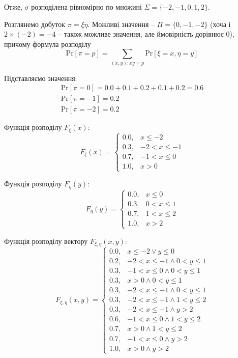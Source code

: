 \documentclass[oneside,solution]{karazin-prob-theory-assign}
\begin{document}
Отже, $\sigma$ розподілена рівномірно по множині $\Sigma = \{-2,-1,0,1,2\}$. 

Розглянемо добуток $\pi = \xi\eta$. Можливі значення -- $\Pi = \{0,-1, -2\}$ (хоча і $2 \times (-2)=-4$ -- також можливе значення, але ймовірність дорівнює $0$), причому формула розподілу
\begin{equation}
    \text{Pr}[\pi=p] = \sum_{(x,y): xy = p} \text{Pr}[\xi=x,\eta=y]
\end{equation}

Підставляємо значення:
\begin{gather}
    \text{Pr}[\pi=0] = 0.0 + 0.1 + 0.2 + 0.1 + 0.2 = 0.6 \\
    \text{Pr}[\pi=-1] = 0.2 \\
    \text{Pr}[\pi=-2] = 0.2
\end{gather}

Функція розподілу $F_{\xi}(x)$:
\begin{equation}
    F_{\xi}(x) = \begin{cases}
        0.0, & x \leq -2 \\
        0.3, & -2 < x \leq -1 \\
        0.7, & -1 < x \leq 0 \\
        1.0, & x > 0
    \end{cases}
\end{equation}

Функція розподілу $F_{\eta}(y)$:
\begin{equation}
    F_{\eta}(y) = \begin{cases}
        0.0, & x \leq 0 \\
        0.3, & 0 < x \leq 1 \\
        0.7, & 1 < x \leq 2 \\
        1.0, & x > 2
    \end{cases}
\end{equation}

Функція розподілу вектору $F_{\xi,\eta}(x,y)$:
\begin{equation}
    F_{\xi,\eta}(x,y) = \begin{cases}
        0.0, & x \leq -2 \vee y \leq 0 \\
        0.2, & -2 < x \leq -1 \wedge 0 < y \leq 1 \\
        0.3, & -1 < x \leq 0 \wedge 0 < y \leq 1 \\
        0.3, & x > 0 \wedge 0 < y \leq 1 \\
        0.3, & -2 < x \leq -1 \wedge 0 < y \leq 1 \\
        0.3, & -2 < x \leq -1 \wedge 1 < y \leq 2 \\
        0.3, & -2 < x \leq -1 \wedge y > 2 \\
        0.6, & -1 < x \leq 0 \wedge 1 < y \leq 2 \\
        0.7, & x > 0 \wedge 1 < y \leq 2 \\
        0.7, & -1 < x \leq 0 \wedge y > 2 \\
        1.0, & x > 0 \wedge y > 2
    \end{cases}
\end{equation}
\end{document}
